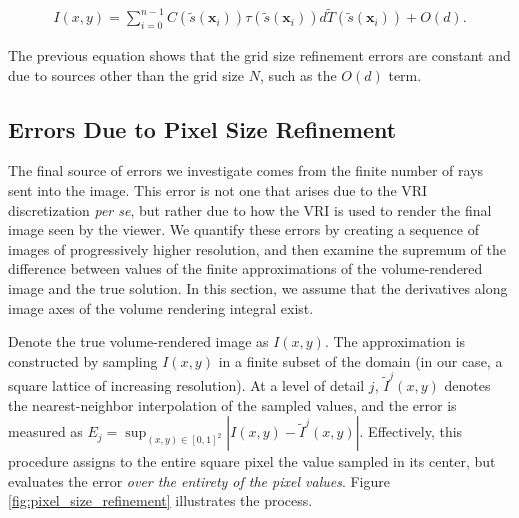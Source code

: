 %
%
\begin{eqnarray}
I(x,y) = \sum_{i = 0} ^ {n - 1} C( \tilde{s}( \mathbf{x}_i)) \tau(
\tilde{s}( \mathbf{x}_i)) d \tilde{T}(\tilde{s}(\mathbf{x}_i)) + O(d). \label{eq:datasetsize}
\end{eqnarray}

The previous equation shows that the grid size refinement errors are constant and due to
sources other than the grid size $N$, such as the $O(d)$ term.

\subsection{Errors Due to Pixel Size Refinement}
\label{sec:VerViaPixelRefinement}

The final source of errors we investigate comes from the finite
number of rays sent into the image. This error is not one that arises due
to the VRI discretization {\em per se}, but rather due to how the VRI
is used to render the final image seen by the viewer.  We quantify  these errors
by creating a sequence of images of progressively higher resolution,
and then examine the supremum of the difference between values of the
finite approximations of the volume-rendered image and the true
solution. In this section, we assume that the derivatives along image axes of
the volume rendering integral exist.

Denote the true volume-rendered image as $I(x,y)$. The approximation is
constructed by sampling $I(x,y)$ in a finite subset of the domain (in
our case, a square lattice of increasing resolution). At a level of
detail $j$, $\tilde{I}^j(x,y)$ denotes the nearest-neighbor
interpolation of the sampled values, and the error is measured as
$E_j = \sup_{(x,y) \in [0,1]^2} |I(x,y) - \tilde{I}^j(x,y)|$. Effectively, this 
procedure assigns to the entire square pixel the value sampled in its
center, but evaluates the error \emph{over the entirety of the pixel values}.
Figure \ref{fig:pixel_size_refinement} illustrates the
process.

